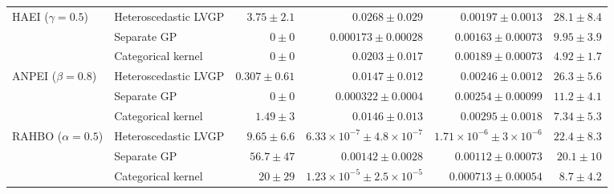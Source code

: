 \begin{table}[htbp]
\begin{tabular}{llrrrr}
\midrule
HAEI ($\gamma=0.5$) & Heteroscedastic LVGP & $3.75 \pm 2.1$ & $0.0268 \pm 0.029$ & $0.00197 \pm 0.0013$ & $28.1 \pm 8.4$ \\
 & Separate GP & \colorbox{green!20}{{\boldmath$0 \pm 0$}} & {\boldmath$0.000173 \pm 0.00028$} & {\boldmath$0.00163 \pm 0.00073$} & $9.95 \pm 3.9$ \\
 & Categorical kernel & \colorbox{green!20}{{\boldmath$0 \pm 0$}} & $0.0203 \pm 0.017$ & $0.00189 \pm 0.00073$ & {\boldmath$4.92 \pm 1.7$} \\
\midrule
ANPEI ($\beta=0.8$) & Heteroscedastic LVGP & $0.307 \pm 0.61$ & $0.0147 \pm 0.012$ & {\boldmath$0.00246 \pm 0.0012$} & $26.3 \pm 5.6$ \\
 & Separate GP & \colorbox{green!20}{{\boldmath$0 \pm 0$}} & {\boldmath$0.000322 \pm 0.0004$} & $0.00254 \pm 0.00099$ & $11.2 \pm 4.1$ \\
 & Categorical kernel & $1.49 \pm 3$ & $0.0146 \pm 0.013$ & $0.00295 \pm 0.0018$ & {\boldmath$7.34 \pm 5.3$} \\
\midrule
RAHBO ($\alpha=0.5$) & Heteroscedastic LVGP & {\boldmath$9.65 \pm 6.6$} & {\boldmath$6.33{\times}10^{-7} \pm 4.8{\times}10^{-7}$} & {\boldmath$1.71{\times}10^{-6} \pm 3{\times}10^{-6}$} & $22.4 \pm 8.3$ \\
 & Separate GP & $56.7 \pm 47$ & $0.00142 \pm 0.0028$ & $0.00112 \pm 0.00073$ & $20.1 \pm 10$ \\
 & Categorical kernel & $20 \pm 29$ & $1.23{\times}10^{-5} \pm 2.5{\times}10^{-5}$ & $0.000713 \pm 0.00054$ & {\boldmath$8.7 \pm 4.2$} \\
\bottomrule
\end{tabular}
\end{table}
